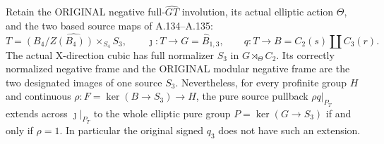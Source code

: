 Retain the ORIGINAL negative full-\(\widehat{GT}\) involution,
its actual elliptic action \(\Theta\), and the two based source maps
of A.134--A.135:
\[
 T=\widehat{(B_4/Z(B_4))\times_{S_4}S_3},
 \qquad \jmath:T\longrightarrow G=\widehat B_{1,3},
 \qquad q:T\longrightarrow B=C_2(s)\amalg C_3(r).
\]
The actual X-direction cubic has full normalizer \(S_3\) in
\(G\rtimes_\Theta C_2\). Its correctly normalized negative frame
and the ORIGINAL modular negative frame are the two designated
images of one source \(S_3\).
Nevertheless, for every profinite group \(H\) and continuous
\(\rho:F=\ker(B\to S_3)\to H\), the pure source pullback
\(\rho q|_{P_T}\) extends across \(\jmath|_{P_T}\) to the whole
elliptic pure group \(P=\ker(G\to S_3)\) if and only if
\(\rho=1\). In particular the original signed \(q_3\) does not
have such an extension.
